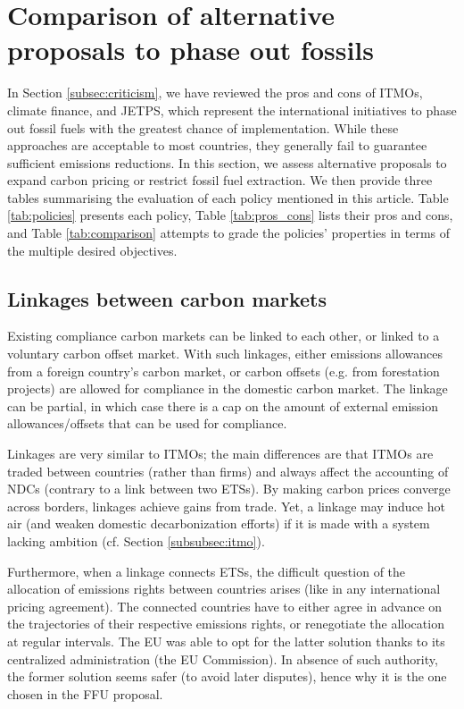 \documentclass[12pt,english]{article}
\begin{document}
\section{Comparison of alternative proposals to phase out fossils} %

In Section \ref{subsec:criticism}, we have reviewed the pros and cons of ITMOs, climate finance, and JETPS, which represent the international initiatives to phase out fossil fuels with the greatest chance of implementation. While these approaches are acceptable to most countries, they generally fail to guarantee sufficient emissions reductions. In this section, we assess alternative proposals to expand carbon pricing or restrict fossil fuel extraction. We then provide three tables summarising the evaluation of each policy mentioned in this article.  Table \ref{tab:policies} presents each policy, Table \ref{tab:pros_cons} lists their pros and cons, and Table \ref{tab:comparison} attempts to grade the policies' properties in terms of the multiple desired objectives. 

\subsection{Linkages between carbon markets}

Existing compliance carbon markets can be linked to each other, or linked to a voluntary carbon offset market.\citep{jaffe_linking_2010} With such linkages, either emissions allowances from a foreign country's carbon market, or carbon offsets (e.g. from forestation projects) are allowed for compliance in the domestic carbon market. The linkage can be partial, in which case there is a cap on the amount of external emission allowances/offsets that can be used for compliance. 

Linkages are very similar to ITMOs; the main differences are that ITMOs are traded between countries (rather than firms) and always affect the accounting of NDCs (contrary to a link between two ETSs). By making carbon prices converge across borders, linkages achieve gains from trade. Yet, a linkage may induce hot air (and weaken domestic decarbonization efforts) if it is made with a system lacking ambition (cf. Section \ref{subsubsec:itmo}). 

Furthermore, when a linkage connects ETSs, the difficult question of the allocation of emissions rights between countries arises (like in any international pricing agreement). The connected countries have to either agree in advance on the trajectories of their respective emissions rights, or renegotiate the allocation at regular intervals. The EU was able to opt for the latter solution thanks to its centralized administration (the EU Commission). In absence of such authority, the former solution seems safer (to avoid later disputes), hence why it is the one chosen in the FFU proposal.
\end{document}
